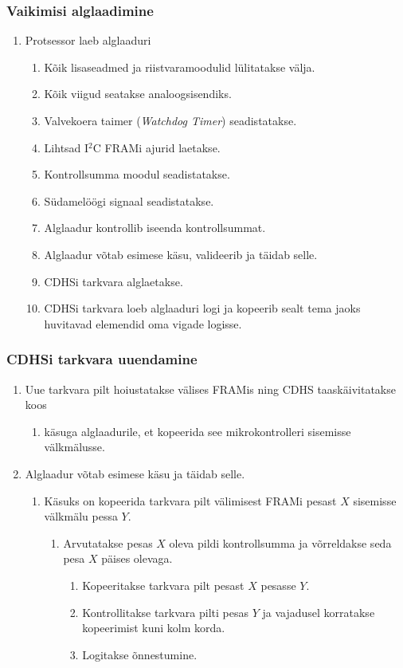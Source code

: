 \documentclass[12pt,a4paper]{article}
\newcommand{\iic}{I${}^2$C }
\begin{document}
\subsubsection{Vaikimisi alglaadimine}
\begin{enumerate}
\item Protsessor laeb alglaaduri
	\begin{enumerate}
	\item Kõik lisaseadmed ja riistvaramoodulid lülitatakse välja.
	\item Kõik viigud seatakse analoogsisendiks.
	\item Valvekoera taimer (\textit{Watchdog Timer}) seadistatakse.
	\item Lihtsad \iic FRAMi ajurid laetakse.
	\item Kontrollsumma moodul seadistatakse.
	\item Südamelöögi signaal seadistatakse.
	\item Alglaadur kontrollib iseenda kontrollsummat.
	\item Alglaadur võtab esimese käsu, valideerib ja täidab selle.
	\item CDHSi tarkvara alglaetakse.
	\item CDHSi tarkvara loeb alglaaduri logi ja kopeerib sealt tema jaoks
		huvitavad elemendid oma vigade logisse.
	\end{enumerate}
\end{enumerate}

\subsubsection{CDHSi tarkvara uuendamine}
\begin{enumerate}
	\item Uue tarkvara pilt hoiustatakse välises FRAMis ning CDHS
		taaskäivitatakse koos
		\begin{enumerate}
			\item käsuga alglaadurile, et kopeerida see mikrokontrolleri
				sisemisse välkmälusse.
		\end{enumerate}
	\item Alglaadur võtab esimese käsu ja täidab selle.
		\begin{enumerate}
			\item Käsuks on kopeerida tarkvara pilt välimisest FRAMi pesast \(X\)
				sisemisse välkmälu pessa \(Y\).
				\begin{enumerate}
					\item Arvutatakse pesas \(X\) oleva pildi kontrollsumma ja
						võrreldakse seda pesa \(X\) päises olevaga.
						\begin{enumerate}
							\item Kopeeritakse tarkvara pilt pesast \(X\) pesasse \(Y\).
							\item Kontrollitakse tarkvara pilti pesas \(Y\) ja
								vajadusel korratakse kopeerimist kuni kolm
								korda.
							\item Logitakse õnnestumine.
						\end{enumerate}
				\end{enumerate}
		\end{enumerate}
\end{enumerate}
\end{document}
